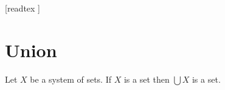 \documentclass[10pt]{article}
\begin{document}
  \begin{imports}
    \begin{forthel}
      [readtex ]
    \end{forthel}
  \end{imports}


  \section{Union}

  \begin{forthel}
    \begin{axiom}
      Let $X$ be a system of sets.
      If $X$ is a set then $\bigcup X$ is a set.
    \end{axiom}
  \end{forthel}
\end{document}
